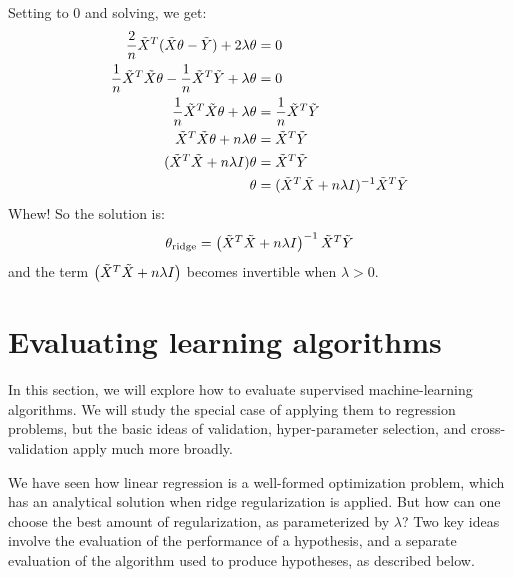 Setting to 0 and solving, we get:
\begin{align*}
  \frac{2}{n}\tilde{X}^T(\tilde{X}\theta - \tilde{Y}) + 2 \lambda \theta             & = 0                                      \\
  \frac{1}{n}\tilde{X}^T\tilde{X}\theta - \frac{1}{n}\tilde{X}^T\tilde{Y} + \lambda \theta & = 0                                      \\
  \frac{1}{n}\tilde{X}^T\tilde{X}\theta  + \lambda \theta                      & = \frac{1}{n}\tilde{X}^T\tilde{Y}                    \\
  \tilde{X}^T\tilde{X}\theta  + n \lambda \theta                               & = \tilde{X}^T\tilde{Y}                               \\
  (\tilde{X}^T\tilde{X}  + n \lambda I)\theta                                  & = \tilde{X}^T\tilde{Y}                               \\
  \theta                                                           & = (\tilde{X}^T\tilde{X}  + n \lambda I)^{-1}\tilde{X}^T\tilde{Y}
\end{align*}
Whew!  So the solution is:
\begin{equation}
  \theta_{\text{ridge}} = \left(\tilde{X}^T\tilde{X} + n\lambda I\right)^{-1}\tilde{X}^T\tilde{Y}
  \label{eq:ridge_regression_solution}
\end{equation}
and the term $\left(\tilde{X}^T\tilde{X} + n\lambda I\right)$
becomes invertible when $\lambda > 0$.




\section{Evaluating learning algorithms}\label{sec-reg_learn_alg}

In this section, we will explore how to evaluate supervised
machine-learning algorithms.  We will study the special case of
applying them to regression problems, but the basic ideas of
validation, hyper-parameter selection, and cross-validation apply much
more
broadly.

We have seen how linear regression is a well-formed optimization
problem, which has an analytical solution when ridge regularization is
applied.  But how can one choose the best amount of regularization, as
parameterized by $\lambda$?  Two key ideas involve the evaluation of
the performance of a hypothesis, and a separate evaluation of the
algorithm used to produce hypotheses, as described below.

